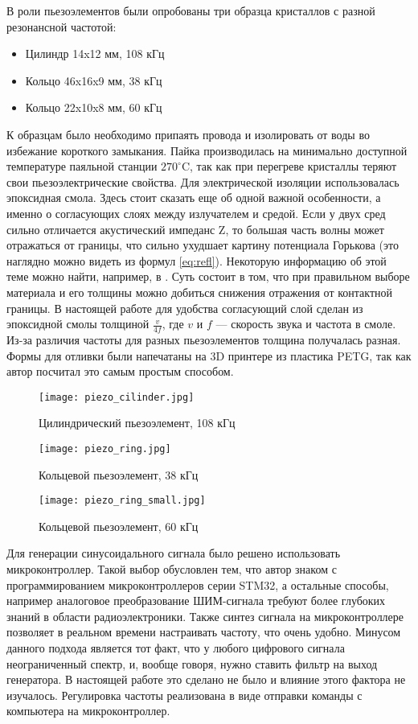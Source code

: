 В роли пьезоэлементов были опробованы три образца кристаллов с разной резонансной частотой:
\begin{itemize}
	\item Цилиндр 14x12 мм, 108 кГц
	\item Кольцо 46x16x9 мм, 38 кГц
	\item Кольцо 22x10x8 мм, 60 кГц
\end{itemize}
К образцам было необходимо припаять провода и изолировать от воды во избежание короткого замыкания. Пайка производилась на минимально доступной температуре паяльной станции $270^\circ\mathrm{C}$, так как при перегреве кристаллы теряют свои пьезоэлектрические свойства. Для электрической изоляции использовалась эпоксидная смола. Здесь стоит сказать еще об одной важной особенности, а именно о согласующих слоях между излучателем и средой. Если у двух сред сильно отличается акустический импеданс Z, то большая часть волны может отражаться от границы, что сильно ухудшает картину потенциала Горькова (это наглядно можно видеть из формул \ref{eq:refl}). Некоторую информацию об этой теме можно найти, например, в \cite{matching_layers}. Суть состоит в том, что при правильном выборе материала и его толщины можно добиться снижения отражения от контактной границы. В настоящей работе для удобства согласующий слой сделан из эпоксидной смолы толщиной $\frac{v}{4f}$, где $v$ и $f$ --- скорость звука и частота в смоле. Из-за различия частоты для разных пьезоэлементов толщина получалась разная. Формы для отливки были напечатаны на 3D принтере из пластика PETG, так как автор посчитал это самым простым способом. 

\begin{figure}[H]
	\centering
	\texttt{[image: piezo\_cilinder.jpg]}
	\caption{Цилиндрический пьезоэлемент, 108 кГц}
	\label{fig:cilindr}
\end{figure}

\begin{figure}[H]
	\centering
	\texttt{[image: piezo\_ring.jpg]}
	\caption{Кольцевой пьезоэлемент, 38 кГц}
	\label{fig:ring}
\end{figure}

\begin{figure}[H]
	\centering
	\texttt{[image: piezo\_ring\_small.jpg]}
	\caption{Кольцевой пьезоэлемент, 60 кГц}
	\label{fig:ring_small}
\end{figure}

Для генерации синусоидального сигнала было решено использовать микроконтроллер. Такой выбор обусловлен тем, что автор знаком с программированием микроконтроллеров серии STM32, а остальные способы, например аналоговое преобразование ШИМ-сигнала требуют более глубоких знаний в области радиоэлектроники. Также синтез сигнала на микроконтроллере позволяет в реальном времени настраивать частоту, что очень удобно. Минусом данного подхода является тот факт, что у любого цифрового сигнала неограниченный спектр, и, вообще говоря, нужно ставить фильтр на выход генератора. В настоящей работе это сделано не было и влияние этого фактора не изучалось. Регулировка частоты реализована в виде отправки команды с компьютера на микроконтроллер.

